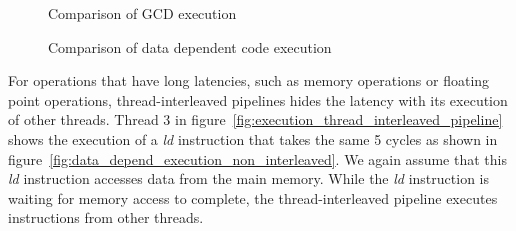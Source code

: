 \begin{figure}[h]
\begin{center}
\noindent{}
\end{center}
\vspace{-3mm}
\caption{Comparison of GCD execution}
\label{fig:branch_execution_compare}
\end{figure}

\begin{figure}[h]
\begin{center}
\noindent{}
\end{center}
\vspace{-3mm}
\caption{Comparison of data dependent code execution}
\label{fig:data_dazard_execution_compare}
\end{figure}

For operations that have long latencies, such as memory operations or floating point operations, thread-interleaved pipelines hides the latency with its execution of other threads. 
Thread 3 in figure~\ref{fig:execution_thread_interleaved_pipeline} shows the execution of a \emph{ld} instruction that takes the same 5 cycles as shown in figure~\ref{fig:data_depend_execution_non_interleaved}.
We again assume that this \emph{ld} instruction accesses data from the main memory. 
While the \emph{ld} instruction is waiting for memory access to complete, the thread-interleaved pipeline executes instructions from other threads.


